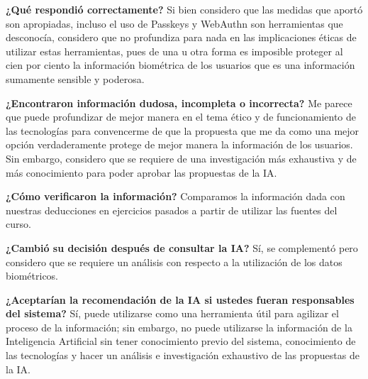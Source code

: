 \begin{enumerateColor}
    \item \textbf{¿Qué respondió correctamente?}
	   Si bien considero que las medidas que aportó son apropiadas, incluso el uso de Passkeys y WebAuthn son herramientas que desconocía, considero que no profundiza para nada en las implicaciones éticas de utilizar estas herramientas, pues de una u otra forma es imposible proteger al cien por ciento la información biométrica de los usuarios que es una información sumamente sensible y poderosa.

    \item \textbf{¿Encontraron información dudosa, incompleta o incorrecta?}
	    Me parece que puede profundizar de mejor manera en el tema ético y de funcionamiento de las tecnologías para convencerme de que la propuesta que me da como una mejor opción verdaderamente protege de mejor manera la información de los usuarios. Sin embargo, considero que se requiere de una investigación más exhaustiva y de más conocimiento para poder aprobar las propuestas de la IA.

    \item \textbf{¿Cómo verificaron la información?}
	    Comparamos la información dada con nuestras deducciones en ejercicios pasados a partir de utilizar las fuentes del curso.

    \item \textbf{¿Cambió su decisión después de consultar la IA?}
	    Sí, se complementó pero considero que se requiere un análisis con respecto a la utilización de los datos biométricos.

    \item \textbf{¿Aceptarían la recomendación de la IA si ustedes fueran responsables del sistema?}
	    Sí, puede utilizarse como una herramienta útil para agilizar el proceso de la información; sin embargo, no puede utilizarse la información de la Inteligencia Artificial sin tener conocimiento previo del sistema, conocimiento de las tecnologías y hacer un análisis e investigación exhaustivo de las propuestas de la IA.
\end{enumerateColor}
